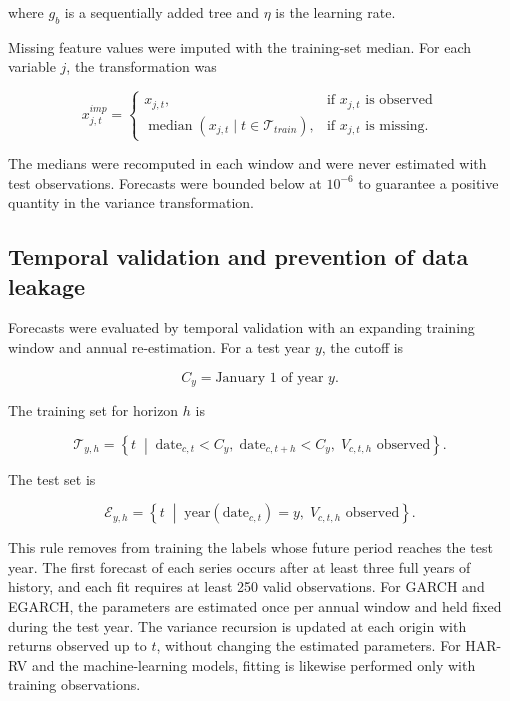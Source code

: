 \documentclass[a4paper,fleqn]{cas-sc}
\begin{document}
where \(g_b\) is a sequentially added tree and \(\eta\) is the learning rate.

Missing feature values were imputed with the training-set median. For each variable \(j\), the transformation was

\begin{equation}
x^{imp}_{j,t}
=
\begin{cases}
x_{j,t}, & \text{if }x_{j,t}\text{ is observed} \\
\operatorname{median}\left(x_{j,t}\mid t\in\mathcal{T}_{train}\right), & \text{if }x_{j,t}\text{ is missing}.
\end{cases}
\label{eq:imputation}
\end{equation}

The medians were recomputed in each window and were never estimated with test observations. Forecasts were bounded below at \(10^{-6}\) to guarantee a positive quantity in the variance transformation.

\subsection{Temporal validation and prevention of data leakage}
\label{subsec:temporal_validation}

Forecasts were evaluated by temporal validation with an expanding training window and annual re-estimation. For a test year \(y\), the cutoff is

\begin{equation}
C_y=\text{January 1 of year }y.
\label{eq:cutoff}
\end{equation}

The training set for horizon \(h\) is

\begin{equation}
\mathcal{T}_{y,h}
=
\left\{
t
\;\middle|\;
\text{date}_{c,t}<C_y,\;
\text{date}_{c,t+h}<C_y,\;
V_{c,t,h}\text{ observed}
\right\}.
\label{eq:train_set}
\end{equation}

The test set is

\begin{equation}
\mathcal{E}_{y,h}
=
\left\{
t
\;\middle|\;
\text{year}(\text{date}_{c,t})=y,\;
V_{c,t,h}\text{ observed}
\right\}.
\label{eq:test_set}
\end{equation}

This rule removes from training the labels whose future period reaches the test year. The first forecast of each series occurs after at least three full years of history, and each fit requires at least 250 valid observations. For GARCH and EGARCH, the parameters are estimated once per annual window and held fixed during the test year. The variance recursion is updated at each origin with returns observed up to \(t\), without changing the estimated parameters. For HAR-RV and the machine-learning models, fitting is likewise performed only with training observations.
\end{document}
